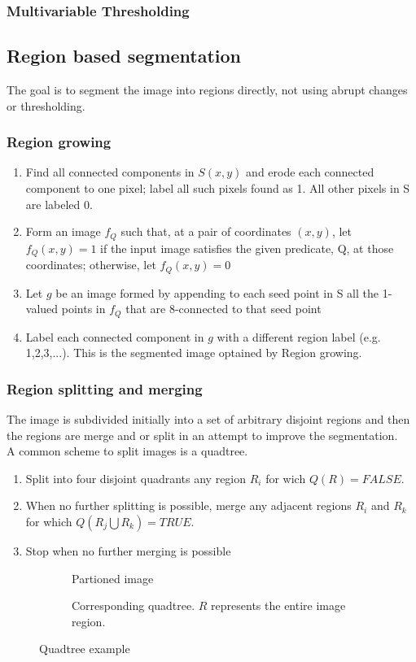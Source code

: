 \subsubsection{Multivariable Thresholding}
\subsection{Region based segmentation}
The goal is to segment the image into regions directly, not using abrupt changes or thresholding.
\subsubsection{Region growing}
\begin{enumerate}
\item Find all connected components in $S(x,y)$ and erode each connected component to one pixel; label all such pixels found as 1. All other pixels in S are labeled 0.
\item Form an image $f_Q$ such that, at a pair of coordinates $(x,y)$, let $f_Q(x,y)=1$ if the input image satisfies the given predicate, Q, at those coordinates; otherwise, let $f_Q(x,y)=0$
\item Let $g$ be an image formed by appending to each seed point in S all the 1-valued points in $f_Q$ that are 8-connected to that seed point
\item Label each connected component in $g$ with a different region label (e.g. 1,2,3,...). This is the segmented image optained by Region growing.
\end{enumerate}
\subsubsection{Region splitting and merging}
The image is subdivided initially into a set of arbitrary disjoint regions and then the regions are merge and or split in an attempt to improve the segmentation.\\
A common scheme to split images is a quadtree.\\
\begin{enumerate}
	\item Split into four disjoint quadrants any region $R_i$ for wich $Q(R)= FALSE$. 
	\item When no further splitting is possible, merge any adjacent regions $R_i$ and $R_k$ for which $Q(R_j\bigcup R_k) = TRUE$.
	\item Stop when no further merging is possible
\end{enumerate}
\begin{figure}[h]
	\centering
	\begin{subfigure}{0.3\textwidth}
		\centering
		
		\caption{Partioned image}
	\end{subfigure}
	\begin{subfigure}{0.5\textwidth}
		\centering
		
		\caption{Corresponding quadtree. $R$ represents the entire image region.}
	\end{subfigure}
	\caption{Quadtree example}
\end{figure}


